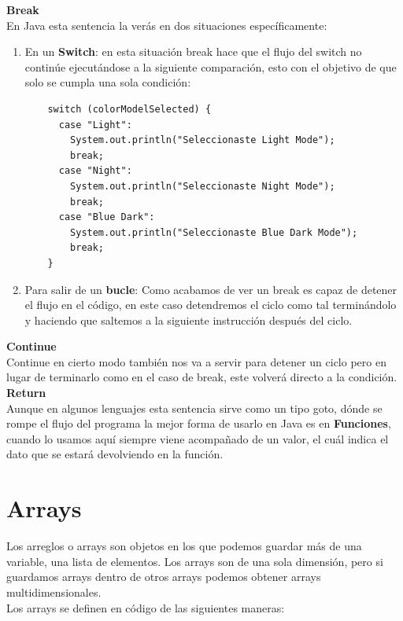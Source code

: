 \documentclass{article}
\begin{document}
\textbf{Break}\\
En Java esta sentencia la verás en dos situaciones específicamente:
\begin{enumerate}
  \item En un \textbf{Switch}: en esta situación break hace que el flujo del
    switch no continúe ejecutándose a la siguiente comparación, esto con el
    objetivo de que solo se cumpla una sola condición:

  \begin{verbatim}
    switch (colorModelSelected) {
      case "Light":
        System.out.println("Seleccionaste Light Mode");
        break;
      case "Night":
        System.out.println("Seleccionaste Night Mode");
        break;
      case "Blue Dark":
        System.out.println("Seleccionaste Blue Dark Mode");
        break;
    }
  \end{verbatim}

  \item Para salir de un \textbf{bucle}: Como acabamos de ver un break es capaz
    de detener el flujo en el código, en este caso detendremos el ciclo como
    tal terminándolo y haciendo que saltemos a la siguiente instrucción después
    del ciclo.
\end{enumerate}

\textbf{Continue}\\
Continue en cierto modo también nos va a servir para detener un ciclo pero en
lugar de terminarlo como en el caso de break, este volverá directo a la
condición.\\

\textbf{Return}\\
Aunque en algunos lenguajes esta sentencia sirve como un tipo goto, dónde se
rompe el flujo del programa la mejor forma de usarlo en Java es en
\textbf{Funciones}, cuando lo usamos aquí siempre viene acompañado de un valor,
el cuál indica el dato que se estará devolviendo en la función.


\section{Arrays}%
Los arreglos o arrays son objetos en los que podemos guardar más de una
variable, una lista de elementos. Los arrays son de una sola dimensión, pero si
guardamos arrays dentro de otros arrays podemos obtener arrays
multidimensionales.\\

Los arrays se definen en código de las siguientes maneras:
\end{document}
